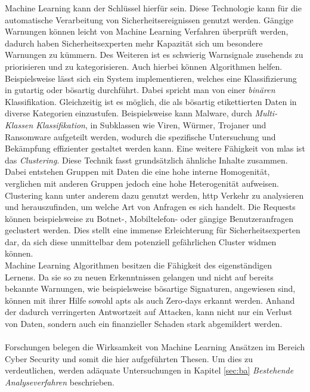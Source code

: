 \documentclass[
    12pt, %
    DIV10,
    ngerman, %
    a4paper, %
    oneside, %
    titlepage, %
    parskip=half, %
    headings=normal, %
    listof=totoc, %
    bibliography=totoc, %
    index=totoc, %
    captions=tableheading, %
    final %
]{scrreprt}
\begin{document}
Machine Learning kann der Schlüssel hierfür sein. Diese Technologie kann für die automatische Verarbeitung von Sicherheitsereignissen genutzt werden. Gängige Warnungen können leicht von Machine Learning Verfahren überprüft werden, dadurch haben Sicherheitsexperten mehr Kapazität sich um besondere Warnungen zu kümmern. Des Weiteren ist es schwierig Warnsignale zusehends zu priorisieren und zu kategorisieren. Auch hierbei können Algorithmen helfen. Beispielsweise lässt sich ein System implementieren, welches eine Klassifizierung in gutartig oder bösartig durchführt. Dabei spricht man von einer \emph{binären} Klassifikation. Gleichzeitig ist es möglich, die als bösartig etikettierten Daten in diverse Kategorien einzustufen. Beispielsweise kann Malware, durch \emph{Multi-Klassen Klassifikation}, in Subklassen wie Viren, Würmer, Trojaner und Ransomware aufgeteilt werden, wodurch die spezifische Untersuchung und Bekämpfung effizienter gestaltet werden kann.  Eine weitere Fähigkeit von \ac{mlas} ist das \emph{Clustering}. Diese Technik fasst grundsätzlich ähnliche Inhalte zusammen. Dabei entstehen Gruppen mit Daten die eine hohe interne Homogenität, verglichen mit anderen Gruppen jedoch eine hohe Heterogenität aufweisen. Clustering kann unter anderem dazu genutzt werden, \ac{http} Verkehr zu analysieren und herauszufinden, um welche Art von Anfragen es sich handelt. Die Requests können beispielsweise zu Botnet-, Mobiltelefon- oder gängige Benutzeranfragen geclustert werden. Dies stellt eine immense Erleichterung für Sicherheitsexperten dar, da sich diese unmittelbar dem potenziell gefährlichen Cluster widmen können. \\Machine Learning Algorithmen besitzen die Fähigkeit des eigenständigen Lernens. Da sie so zu neuen Erkenntnissen gelangen und nicht auf bereits bekannte Warnungen, wie beispielsweise bösartige Signaturen, angewiesen sind, können mit ihrer Hilfe sowohl \ac{apts} als auch Zero-days erkannt werden. Anhand der dadurch verringerten Antwortzeit auf Attacken, kann nicht nur ein Verlust von Daten, sondern auch ein finanzieller Schaden stark abgemildert werden.
\\\\
Forschungen belegen die Wirksamkeit von Machine Learning Ansätzen im Bereich Cyber Security und somit die hier aufgeführten Thesen. Um dies zu verdeutlichen, werden adäquate Untersuchungen in Kapitel \ref{sec:ba} \emph{Bestehende Analyseverfahren} beschrieben.
\end{document}
